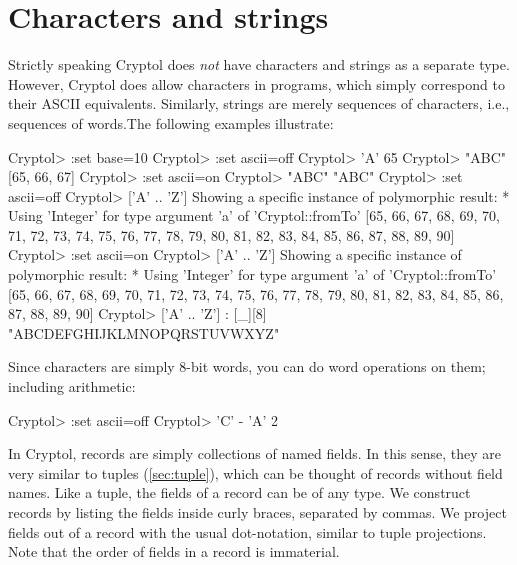 \section{Characters and strings}
\label{sec:charstring}

Strictly speaking Cryptol does {\em not} have characters and strings
as a separate type. However, Cryptol does allow characters in
programs, which simply correspond to their ASCII
equivalents. Similarly, strings are merely sequences of characters,
i.e., sequences of words.\indTheStringType\indTheCharType The
following examples illustrate:
\restartrepl
\begin{replPrompt}
  Cryptol> :set base=10
  Cryptol> :set ascii=off
  Cryptol> 'A'
  65
  Cryptol> "ABC"
  [65, 66, 67]
  Cryptol> :set ascii=on
  Cryptol> "ABC"
  "ABC"
  Cryptol> :set ascii=off
  Cryptol> ['A' .. 'Z']
  Showing a specific instance of polymorphic result:
    * Using 'Integer' for type argument 'a' of 'Cryptol::fromTo'
  [65, 66, 67, 68, 69, 70, 71, 72, 73, 74, 75, 76, 77, 78, 79, 80,
   81, 82, 83, 84, 85, 86, 87, 88, 89, 90]
  Cryptol> :set ascii=on
  Cryptol> ['A' .. 'Z']
  Showing a specific instance of polymorphic result:
    * Using 'Integer' for type argument 'a' of 'Cryptol::fromTo'
  [65, 66, 67, 68, 69, 70, 71, 72, 73, 74, 75, 76, 77, 78, 79, 80,
   81, 82, 83, 84, 85, 86, 87, 88, 89, 90]
  Cryptol> ['A' .. 'Z'] : [_][8]
  "ABCDEFGHIJKLMNOPQRSTUVWXYZ"
\end{replPrompt}

\noindent Since characters are simply 8-bit words, you can do word
operations on them; including arithmetic:
\begin{replPrompt}
  Cryptol> :set ascii=off
  Cryptol> 'C' - 'A'
  2
\end{replPrompt}


In Cryptol, records are simply collections of named fields. In this
sense, they are very similar to tuples (\autoref{sec:tuple}), which
can be thought of records without field names. Like a tuple, the
fields of a record can be of any type. We construct records by listing
the fields inside curly braces, separated by commas. We project fields
out of a record with the usual dot-notation, similar to tuple
projections. Note that the order of fields in a record is
immaterial.\indTheRecordType\indTheTupleType

